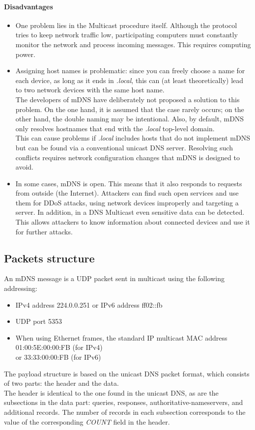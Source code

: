 \documentclass[fleqn, 10pt]{SelfArx} %
\begin{document}
\paragraph{Disadvantages} 
\begin{itemize}[leftmargin=*]
    \item One problem lies in the Multicast procedure itself. Although the protocol tries to keep network traffic low, participating computers must constantly monitor the network and process incoming messages. This requires computing power.
    \item Assigning host names is problematic: since you can freely choose a name for each device, as long as it ends in {\it{.local}}, this can (at least theoretically) lead to two network devices with the same host name.\\
          The developers of mDNS have deliberately not proposed a solution to this problem. On the one hand, it is assumed that the case rarely occurs; on the other hand, the double naming may be intentional. Also, by default, mDNS only resolves hostnames that end with the {\it{.local}} top-level domain. \\
          This can cause problems if {\it{.local}} includes hosts that do not implement mDNS but can be found via a conventional unicast DNS server. Resolving such conflicts requires network configuration changes that mDNS is designed to avoid.
    \item In some cases, mDNS is open. This means that it also responds to requests from outside (the Internet). Attackers can find such open services and use them for DDoS attacks, using network devices improperly and targeting a server. In addition, in a DNS Multicast even sensitive data can be detected. 
	      This allows attackers to know information about connected devices and use it for further attacks.
\end{itemize}

\subsection{Packets structure}
An mDNS message is a UDP packet sent in multicast using the following addressing:
\begin{itemize}[leftmargin=*]
    \item IPv4 address 224.0.0.251 or IPv6 address ff02::fb
    \item UDP port 5353
    \item When using Ethernet frames, the standard IP multicast MAC address 01:00:5E:00:00:FB (for IPv4) \\or 33:33:00:00:FB (for IPv6)
\end{itemize}
The payload structure is based on the unicast DNS packet format, which consists of two parts: the header and the data.\\
The header is identical to the one found in the unicast DNS, as are the subsections in the data part: queries, responses, authoritative-nameservers, and additional records. The number of records in each subsection corresponds to the value of the corresponding {\it{COUNT}} field in the header.
\end{document}
